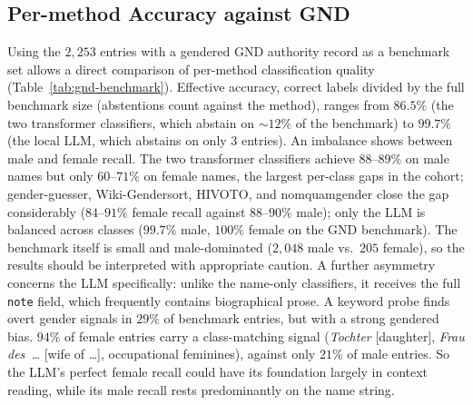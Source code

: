 \documentclass{eceasst}
\begin{document}
\subsection{Per-method Accuracy against GND} Using the $2{,}253$ entries with a gendered GND authority record as a benchmark set allows a direct comparison of per-method classification quality (Table~\ref{tab:gnd-benchmark}). Effective accuracy, correct labels divided by the full benchmark size (abstentions count against the method), ranges from $86.5\%$ (the two transformer classifiers, which abstain on $\sim$$12\%$ of the benchmark) to $99.7\%$ (the local LLM, which abstains on only $3$ entries). An imbalance shows between male and female recall. The two transformer classifiers achieve $88$--$89\%$ on male names but only $60$--$71\%$ on female names, the largest per-class gaps in the cohort; gender-guesser, Wiki-Gendersort, HIVOTO, and nomquamgender close the gap considerably ($84$--$91\%$ female recall against $88$--$90\%$ male); only the LLM is balanced across classes ($99.7\%$ male, $100\%$ female on the GND benchmark). The benchmark itself is small and male-dominated ($2{,}048$ male vs.\ $205$ female), so the results should be interpreted with appropriate caution. A further asymmetry concerns the LLM specifically: unlike the name-only classifiers, it receives the full \texttt{note} field, which frequently contains biographical prose. A keyword probe finds
overt gender signals in $29\%$ of benchmark entries, but with a strong gendered bias. $94\%$ of female entries carry a class-matching signal (\emph{Tochter} [daughter], \emph{Frau des~\dots} [wife of \dots], occupational feminines), against only $21\%$ of male entries. So the LLM's perfect female recall could have its foundation largely in context reading, while its male recall rests predominantly on the name string.
\end{document}
